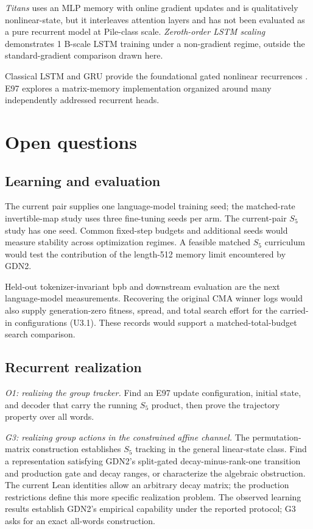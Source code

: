 \documentclass[10pt]{article}
\theoremstyle{canonical}
\theoremstyle{canonicalbullet}
\begin{document}
\emph{Titans} \citep{titans2025} uses an MLP memory with online gradient updates and is qualitatively nonlinear-state, but it interleaves attention layers and has not been evaluated as a pure recurrent model at Pile-class scale. \emph{Zeroth-order LSTM scaling} \citep{lstm_zoo_2025} demonstrates 1 B-scale LSTM training under a non-gradient regime, outside the standard-gradient comparison drawn here.

Classical LSTM and GRU provide the foundational gated nonlinear recurrences \citep{lstm1997}. E97 explores a matrix-memory implementation organized around many independently addressed recurrent heads.


\section{Open questions}\label{sec:limitations}



\subsection*{Learning and evaluation}


The current pair supplies one language-model training seed; the matched-rate invertible-map study uses three fine-tuning seeds per arm. The current-pair ${S }_{5}$ study has one seed. Common fixed-step budgets and additional seeds would measure stability across optimization regimes. A feasible matched ${S }_{5}$ curriculum would test the contribution of the length-512 memory limit encountered by GDN2.

Held-out tokenizer-invariant bpb and downstream evaluation are the next language-model measurements. Recovering the original CMA winner logs would also supply generation-zero fitness, spread, and total search effort for the carried-in configurations (U3.1). These records would support a matched-total-budget search comparison.


\subsection*{Recurrent realization}


\emph{O1: realizing the group tracker.} Find an E97 update configuration, initial state, and decoder that carry the running ${S }_{5}$ product, then prove the trajectory property over all words.

\emph{G3: realizing group actions in the constrained affine channel.} The permutation-matrix construction establishes ${S }_{5}$ tracking in the general linear-state class. Find a representation satisfying GDN2's split-gated decay-minus-rank-one transition and production gate and decay ranges, or characterize the algebraic obstruction. The current Lean identities allow an arbitrary decay matrix; the production restrictions define this more specific realization problem. The observed learning results establish GDN2's empirical capability under the reported protocol; G3 asks for an exact all-words construction.
\end{document}
